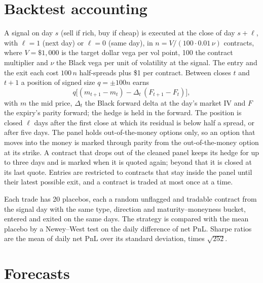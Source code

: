 \section{Backtest accounting}
\label{app:backtest}

A signal on day $s$ (sell if rich, buy if cheap) is executed at the close of day $s+\ell$, with
$\ell=1$ (next day) or $\ell=0$ (same day), in $n=V/(100\cdot0.01\,\nu)$ contracts, where $V=\$1{,}000$ is the
target dollar vega per vol point, 100 the contract multiplier and $\nu$ the Black vega per unit of
volatility at the signal. The
entry and the exit each cost $100\,n$ half-spreads plus \$1 per contract. Between closes $t$ and
$t+1$ a position of signed size $q=\pm100n$ earns
\[
  q\bigl[(m_{t+1}-m_t)-\Delta_t\,(F_{t+1}-F_t)\bigr],
\]
with $m$ the mid price, $\Delta_t$ the Black forward delta at the day's market IV and $F$ the expiry's
parity forward; the hedge is held in the forward. The position is closed $\ell$ days after the first
close at which its residual is below half a spread, or after five days. The panel holds
out-of-the-money options only, so an option that moves into the money is marked through parity from
the out-of-the-money option at its strike. A contract that drops out of the cleaned panel keeps its
hedge for up to three days and is marked when it is quoted again; beyond that it is closed at its
last quote. Entries are restricted to contracts that stay inside the panel until their latest
possible exit, and a contract is traded at most once at a time.

Each trade has 20 placebos, each a random unflagged and tradable contract from the signal day with
the same type, direction and maturity--moneyness bucket, entered and exited on the same days. The
strategy is compared with the mean placebo by a Newey--West test on the daily difference of net PnL.
Sharpe ratios are the mean of daily net PnL over its standard deviation, times $\sqrt{252}$.

\section{Forecasts}
\label{app:forecast}

\begin{table}[h]
  \centering\small
  \caption{Forecast RMSE (vp) on every quote of the target day, $h$ trading days ahead, on the
  validation years. RW is a random walk on the latent or on the origin day's \mixfour{} fit. The $p$-value is
  a Diebold--Mariano test~\citep{diebold1995}, with Newey--West variance~\citep{newey1987}, of the
  VAR against the \mixfour{} random walk; the last column scores the target day's own decoded surface, a floor
  for any forecast through the decoder.}
  \label{tab:forecast}
  
\end{table}

